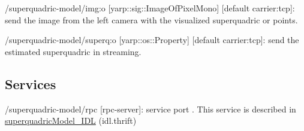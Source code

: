 \begin{DoxyItemize}
\item /superquadric-\/model/img\-:o \mbox{[}yarp\-::sig\-::\-Image\-Of\-Pixel\-Mono\mbox{]} \mbox{[}default carrier\-:tcp\mbox{]}\-: send the image from the left camera with the visualized superquadric or points.
\item /superquadric-\/model/superq\-:o \mbox{[}yarp\-::os\-::\-Property\mbox{]} \mbox{[}default carrier\-:tcp\mbox{]}\-: send the estimated superquadric in streaming.
\end{DoxyItemize}\hypertarget{group__superquadric-model_services_sec}{}\subsection{Services}\label{group__superquadric-model_services_sec}

\begin{DoxyItemize}
\item /superquadric-\/model/rpc \mbox{[}rpc-\/server\mbox{]}\-: service port . This service is described in \hyperlink{classsuperquadricModel__IDL}{superquadric\-Model\-\_\-\-I\-D\-L} (idl.\-thrift) 
\end{DoxyItemize}